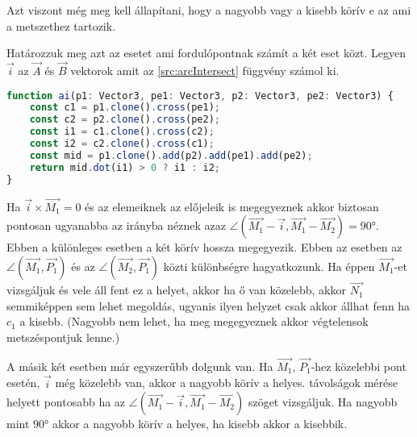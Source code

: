 Azt viszont még meg kell állapítani, hogy a nagyobb vagy a kisebb körív e az ami a metszethez tartozik.

Határozzuk meg azt az esetet ami fordulópontnak számít a két eset közt. Legyen $\overrightarrow{i}$ az $\overrightarrow{A}$ és $\overrightarrow{B}$ vektorok amit az \ref{src:arcIntersect} függvény számol ki.

\begin{lstlisting}[language={JavaScript}]
function ai(p1: Vector3, pe1: Vector3, p2: Vector3, pe2: Vector3) {
	const c1 = p1.clone().cross(pe1);
	const c2 = p2.clone().cross(pe2);
	const i1 = c1.clone().cross(c2);
	const i2 = c2.clone().cross(c1);
	const mid = p1.clone().add(p2).add(pe1).add(pe2);
	return mid.dot(i1) > 0 ? i1 : i2;
}
\end{lstlisting}


Ha $\overrightarrow{i} × \overrightarrow{M_1} = 0$ és az elemeiknek az előjeleik is megegyeznek akkor biztosan pontosan ugyanabba az irányba néznek azaz $\angle (\overrightarrow{M_1} - \overrightarrow{i}, \overrightarrow{M_1} - \overrightarrow{M_2}) = 90°$. Ebben a különleges esetben a két körív hossza megegyezik. Ebben az esetben az $\angle (\overrightarrow{M_1}, \overrightarrow{P_1})$ és az $\angle (\overrightarrow{M_2}, \overrightarrow{P_1})$ közti különbségre hagyatkozunk. Ha éppen $\overrightarrow{M_1}$-et vizsgáljuk és vele áll fent ez a helyet, akkor ha ő van közelebb, akkor $\overrightarrow{N_1}$ semmiképpen sem lehet megoldás, ugyanis ilyen helyzet csak akkor állhat fenn ha $c_1$ a kisebb. (Nagyobb nem lehet, ha meg megegyeznek akkor végtelensok metszéspontjuk lenne.)

A másik két esetben már egyszerűbb dolgunk van. Ha $\overrightarrow{M_1}$, $\overrightarrow{P_1}$-hez közelebbi pont esetén, $\overrightarrow{i}$ még közelebb van, akkor a nagyobb körív a helyes. távolságok mérése helyett pontosabb ha az $\angle(\overrightarrow{M_1} - \overrightarrow{i}, \overrightarrow{M_1} - \overrightarrow{M_2})$ szöget vizsgáljuk. Ha nagyobb mint $90°$ akkor a nagyobb körív a helyes, ha kisebb akkor a kisebbik.

























